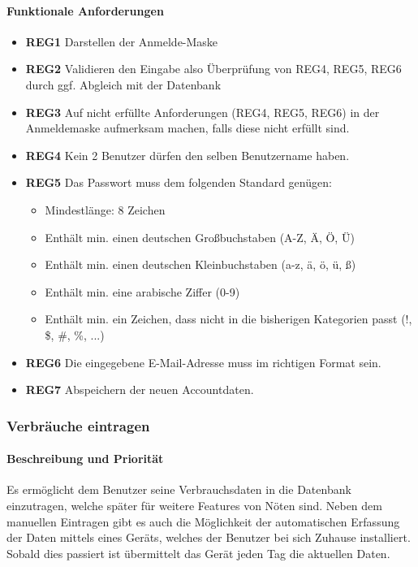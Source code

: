 \paragraph{Funktionale Anforderungen}
\begin{itemize}
	\item \textbf{REG1} Darstellen der Anmelde-Maske
	\item \textbf{REG2} Validieren den Eingabe also Überprüfung von REG4, REG5, REG6  durch ggf. Abgleich mit der Datenbank
	\item \textbf{REG3} Auf nicht erfüllte Anforderungen (REG4, REG5, REG6) in der Anmeldemaske aufmerksam machen, falls diese nicht erfüllt sind.
	\item \textbf{REG4} Kein 2 Benutzer dürfen den selben Benutzername haben.
	\item \textbf{REG5} Das Passwort muss dem folgenden Standard genügen:
	      \begin{itemize}
		      \item Mindestlänge: 8 Zeichen
		      \item Enthält min. einen deutschen Großbuchstaben (A-Z, Ä, Ö, Ü)
		      \item Enthält min. einen deutschen Kleinbuchstaben (a-z, ä, ö, ü, ß)
		      \item Enthält min. eine arabische Ziffer (0-9)
		      \item Enthält min. ein Zeichen, dass nicht in die bisherigen Kategorien passt (!, \$, \#, \%, ...)
	      \end{itemize}
	\item \textbf{REG6} Die eingegebene E-Mail-Adresse muss im richtigen Format sein.
	\item \textbf{REG7} Abspeichern der neuen Accountdaten.

\end{itemize}

\subsubsection{Verbräuche eintragen}
\label{sysf:verb_eintragen}
\paragraph{Beschreibung und Priorität}
Es ermöglicht dem Benutzer seine Verbrauchsdaten in die Datenbank einzutragen, welche später für weitere Features von Nöten sind. Neben dem manuellen Eintragen gibt es auch die Möglichkeit der automatischen Erfassung der Daten mittels eines Geräts, welches der Benutzer bei sich Zuhause installiert. Sobald dies passiert ist übermittelt das Gerät jeden Tag die aktuellen Daten.

